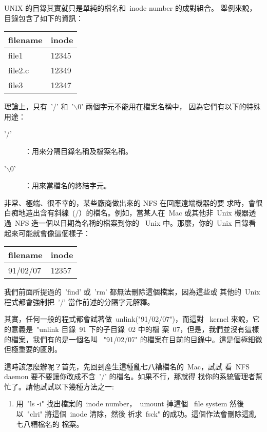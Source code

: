 \documentclass{article}
\begin{document}
\begin{CJK*}{Bg5}{ming}
	UNIX 的目錄其實就只是單純的檔名和~inode number  的成對組合。
	舉例來說，目錄包含了如下的資訊：
\begin{table}[h]
\begin{tabular}{l l}
		filename & inode \\
\hline
		file1    & 12345 \\
		file2.c  & 12349 \\
		file3    & 12347 \\
\end{tabular}
\end{table}
	理論上，只有~'/' 和~'$\backslash$0' 兩個字元不能用在檔案名稱中，
	因為它們有以下的特殊用途：
\begin{description}
\item['/']	：用來分隔目錄名稱及檔案名稱。
\item['$\backslash$0']	：用來當檔名的終結字元。
\end{description}
	非常、極端、很不幸的，某些廠商做出來的 NFS 在回應遠端機器的要
	求時，會很白痴地造出含有斜線~(/）的檔名。例如，當某人在~Mac 
	或其他非~Unix 機器透過~NFS 造一個以日期為名稱的檔案到你的 
	~Unix 中。那麼，你的~Unix 目錄看起來可能就會像這個樣子：
\begin{table}[h]
\begin{tabular}{l l}
		filename & inode \\
		\hline 
		91/02/07 & 12357 \\
\end{tabular}
\end{table}
	我們前面所提過的~'find' 或~'rm' 都無法刪除這個檔案，因為這些或
	其他的~Unix 程式都會強制把~'/' 當作前述的分隔字元解釋。

	其實，任何一般的程式都會試著做~unlink("91/02/07")，而這對 
	~kernel 來說，它的意義是~"unlink 目錄~91 下的子目錄~02 中的檔
	案~07，但是，我們並沒有這樣的檔案，我們有的是一個名叫 
	~"91/02/07" 的檔案在目前的目錄中。這是個極細微但極重要的區別。

	這時該怎麼辦呢？首先，先回到產生這種亂七八糟檔名的~Mac，試試
	看~NFS daemon 要不要讓你改成不含~'/' 的檔名。如果不行，那就得
	找你的系統管理者幫忙了。請他試試以下幾種方法之一: 
	\begin{enumerate}
	\item 用~"ls -i" 找出檔案的~inode number，~umount 掉這個 
	  ~file system 然後以~"clri" 將這個~inode 清除，然後
	   祈求~fsck" 的成功。這個作法會刪除這亂七八糟檔名的
	   檔案。


\end{enumerate}
\end{CJK*}
\end{document}
